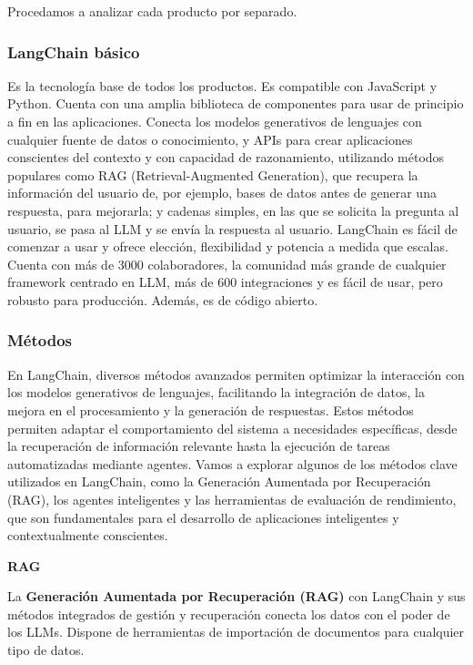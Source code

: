 Procedamos a analizar cada producto por separado.


\subsubsection{LangChain básico}

Es la tecnología base de todos los productos. Es compatible con JavaScript y Python. Cuenta con una amplia biblioteca de componentes para usar de principio a fin en las aplicaciones. Conecta los modelos generativos de lenguajes con cualquier fuente de datos o conocimiento, y APIs para crear aplicaciones conscientes del contexto y con capacidad de razonamiento, utilizando métodos populares como RAG (Retrieval-Augmented Generation), que recupera la información del usuario de, por ejemplo, bases de datos antes de generar una respuesta, para mejorarla; y cadenas simples, en las que se solicita la pregunta al usuario, se pasa al LLM y se envía la respuesta al usuario. LangChain es fácil de comenzar a usar y ofrece elección, flexibilidad y potencia a medida que escalas. Cuenta con más de 3000 colaboradores, la comunidad más grande de cualquier framework centrado en LLM, más de 600 integraciones y es fácil de usar, pero robusto para producción. Además, es de código abierto. \cite{PaginaLangChainOficialBasico}


\subsubsection{Métodos}

En LangChain, diversos métodos avanzados permiten optimizar la interacción con los modelos generativos de lenguajes, facilitando la integración de datos, la mejora en el procesamiento y la generación de respuestas. Estos métodos permiten adaptar el comportamiento del sistema a necesidades específicas, desde la recuperación de información relevante hasta la ejecución de tareas automatizadas mediante agentes. Vamos a explorar algunos de los métodos clave utilizados en LangChain, como la Generación Aumentada por Recuperación (RAG), los agentes inteligentes y las herramientas de evaluación de rendimiento, que son fundamentales para el desarrollo de aplicaciones inteligentes y contextualmente conscientes.

\textbf{RAG}

La \textbf{Generación Aumentada por Recuperación (RAG)} con LangChain y sus métodos integrados de gestión y recuperación conecta los datos con el poder de los LLMs. Dispone de herramientas de importación de documentos para cualquier tipo de datos.

